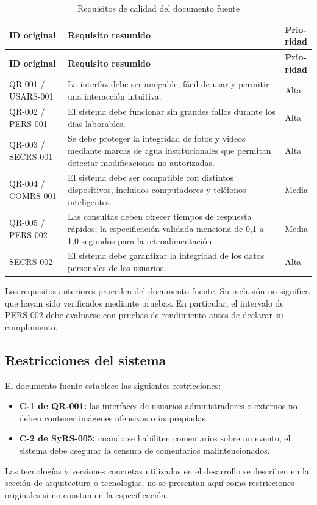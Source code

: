 \begin{longtable}{P{0.18\textwidth} P{0.56\textwidth} P{0.14\textwidth}}
\caption{Requisitos de calidad del documento fuente}\\
\toprule
\textbf{ID original} & \textbf{Requisito resumido} & \textbf{Prio-\newline ridad}\\
\midrule
\endfirsthead
\toprule
\textbf{ID original} & \textbf{Requisito resumido} & \textbf{Prio-\newline ridad}\\
\midrule
\endhead
QR-001 / USARS-001 & La interfaz debe ser amigable, fácil de usar y permitir una interacción intuitiva. & Alta\\
QR-002 / PERS-001 & El sistema debe funcionar sin grandes fallos durante los días laborables. & Alta\\
QR-003 / SECRS-001 & Se debe proteger la integridad de fotos y videos mediante marcas de agua institucionales que permitan detectar modificaciones no autorizadas. & Alta\\
QR-004 / COMRS-001 & El sistema debe ser compatible con distintos dispositivos, incluidos computadores y teléfonos inteligentes. & Media\\
QR-005 / PERS-002 & Las consultas deben ofrecer tiempos de respuesta rápidos; la especificación validada menciona de 0,1 a 1,0 segundos para la retroalimentación. & Media\\
SECRS-002 & El sistema debe garantizar la integridad de los datos personales de los usuarios. & Alta\\
\bottomrule
\end{longtable}

Los requisitos anteriores proceden del documento fuente. Su inclusión no significa que hayan sido verificados mediante pruebas. En particular, el intervalo de PERS-002 debe evaluarse con pruebas de rendimiento antes de declarar su cumplimiento.

\subsection{Restricciones del sistema}
El documento fuente establece las siguientes restricciones:
\begin{itemize}
\item \textbf{C-1 de QR-001:} las interfaces de usuarios administradores o externos no deben contener imágenes ofensivas o inapropiadas.
\item \textbf{C-2 de SyRS-005:} cuando se habiliten comentarios sobre un evento, el sistema debe asegurar la censura de comentarios malintencionados.
\end{itemize}
Las tecnologías y versiones concretas utilizadas en el desarrollo se describen en la sección de arquitectura o tecnologías; no se presentan aquí como restricciones originales si no constan en la especificación.


